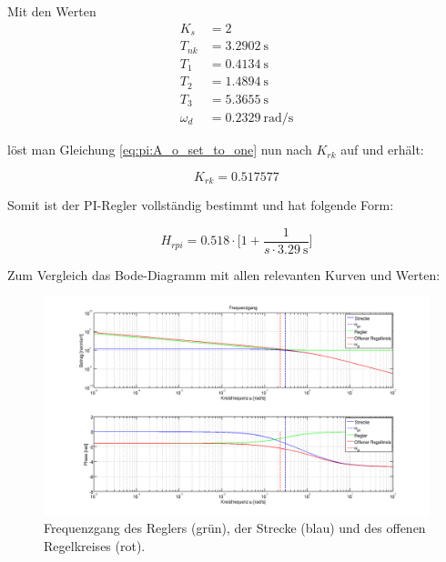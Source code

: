 Mit den Werten
\begin{equation} \label{eq:pi:values}
    \begin{split}
        K_s      & = 2                    \\
        T_{nk}   & = \SI{3.2902}{\second} \\
        T_1      & = \SI{0.4134}{\second} \\
        T_2      & = \SI{1.4894}{\second} \\
        T_3      & = \SI{5.3655}{\second} \\
        \omega_d & = \SI{0.2329}{\radian\per\second}
    \end{split}
\end{equation}

l\"ost  man Gleichung  \ref{eq:pi:A_o_set_to_one}  nun nach  $K_{rk}$ auf  und
erh\"alt:

\begin{equation} \label{eq:pi:k_rk_result}
    K_{rk} = 0.517577
\end{equation}

Somit ist der PI-Regler vollst\"andig bestimmt und hat folgende Form:

\begin{equation} \label{eq:pi:result}
    H_{rpi} = 0.518 \cdot \biggl[ 1 + \frac{1}{s \cdot \SI{3.29}{\second}} \biggr]
\end{equation}

Zum Vergleich das Bode-Diagramm mit allen relevanten Kurven und Werten:
\begin{figure}[h! width=\pagewidth]
    \includegraphics[width=\textwidth]{images/piBode.png}
    \caption{%
        Frequenzgang des Reglers (gr\"un), der  Strecke (blau) und des offenen
        Regelkreises (rot).
    }
    \label{fig:pi:all}
\end{figure}



